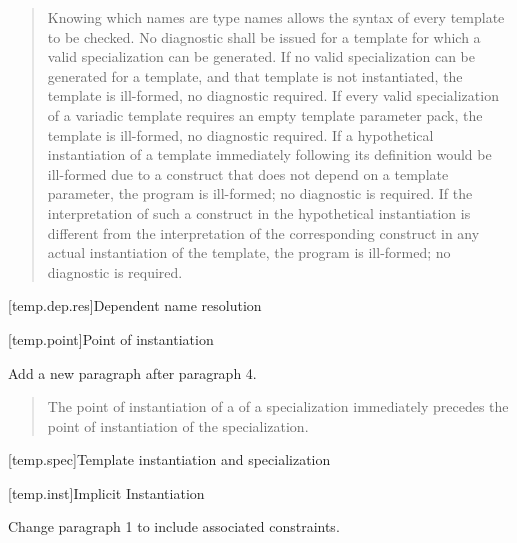 \begin{quote}
\setcounter{Paras}{7}
\pnum
Knowing which names are type names allows the syntax of every
template to be checked. No diagnostic shall be issued for a template
for which a valid specialization can be generated. If no valid
specialization can be generated for a template, and that template is
not instantiated, the template is ill-formed, no diagnostic
required. If every valid specialization of a variadic template
requires an empty template parameter pack, the template is
ill-formed, no diagnostic required. 
% 
% 
% 
If a hypothetical instantiation of a template immediately following
its definition would be ill-formed due to a construct that does not
depend on a template parameter, the program is ill-formed; no
diagnostic is required. If the interpretation of such a construct in
the hypothetical instantiation is different from the interpretation
of the corresponding construct in any actual instantiation of the
template, the program is ill-formed; no diagnostic is required.
\end{quote}

\setcounter{subsection}{3}
[temp.dep.res]{Dependent name resolution}

[temp.point]{Point of instantiation}

Add a new paragraph after paragraph 4.

\begin{quote}
\setcounter{Paras}{4}
\begin{addedblock}
\pnum
The point of instantiation of a  of a
specialization immediately precedes the point of instantiation of
the specialization.
\end{addedblock}
\end{quote}


[temp.spec]{Template instantiation and specialization}

[temp.inst]{Implicit Instantiation}
    
Change paragraph 1 to include associated constraints.

